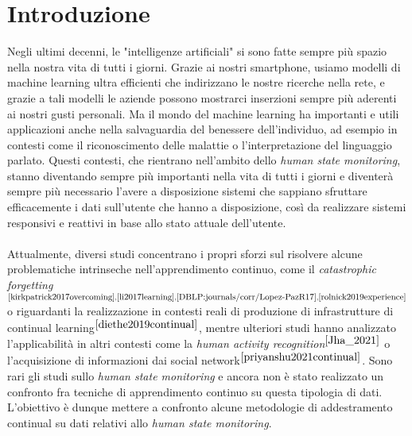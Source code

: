 \chapter*{Introduzione}

Negli ultimi decenni, le "intelligenze artificiali" si sono fatte sempre più spazio nella nostra vita di tutti i giorni. Grazie ai nostri smartphone, usiamo modelli di machine learning ultra efficienti che indirizzano le nostre ricerche nella rete, e grazie a tali modelli le aziende possono mostrarci inserzioni sempre più aderenti ai nostri gusti personali. Ma il mondo del machine learning ha importanti e utili applicazioni anche nella salvaguardia del benessere dell'individuo, ad esempio in contesti come il riconoscimento delle malattie o l'interpretazione del linguaggio parlato. Questi contesti, che rientrano nell'ambito dello \textit{human state monitoring}, stanno diventando sempre più importanti nella vita di tutti i giorni e diventerà sempre più necessario l'avere a disposizione sistemi che sappiano sfruttare efficacemente i dati sull'utente che hanno a disposizione, così da realizzare sistemi responsivi e reattivi in base allo stato attuale dell'utente.\\\\
Attualmente, diversi studi concentrano i propri sforzi sul risolvere alcune problematiche intrinseche nell'apprendimento continuo, come il \textit{catastrophic forgetting}$^{\cite{kirkpatrick2017overcoming},\cite{li2017learning},\cite{DBLP:journals/corr/Lopez-PazR17},\cite{rolnick2019experience}}$ o riguardanti la realizzazione in contesti reali di produzione di infrastrutture di continual learning$^{\cite{diethe2019continual}}$, mentre ulteriori studi hanno analizzato l'applicabilità in altri contesti come la \textit{human activity recognition}$^{\cite{Jha_2021}}$ o l'acquisizione di informazioni dai social network$^{\cite{priyanshu2021continual}}$. Sono rari gli studi sullo \textit{human state monitoring} e ancora non è stato realizzato un confronto fra tecniche di apprendimento continuo su questa tipologia di dati.\\
L'obiettivo è dunque mettere a confronto alcune metodologie di addestramento continual su dati relativi allo \textit{human state monitoring}.
\pagebreak
